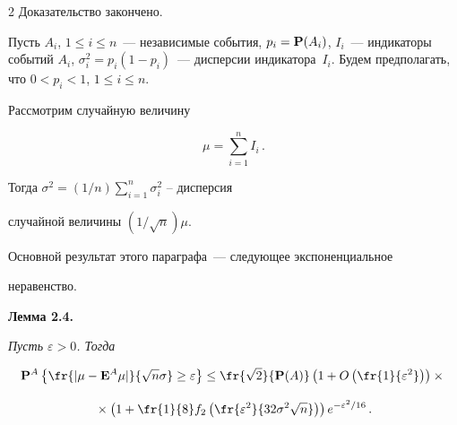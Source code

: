 \begin{multicols}{2}
Доказательство закончено.





\bigskip





Пусть $A_i$, $1\le i\le n$~--- независимые события, $p_i=\P(A_i)$, $I_i$~--- индикаторы событий $A_i$, $\sigma^2_i =


 p_i(1-p_i)$~--- дисперсии индикатора~$I_i$. Будем предполагать, что $0<p_i<1$, $1\le i\le n$. 


 Рас\-смот\-рим случайную величину


$$


\mu=\sum_{i=1}^nI_i\,.


$$


Тогда $\sigma^2=(1/n)\sum\limits_{i=1}^{n}\sigma_i^2$ -- дисперсия


случайной величины $(1/\sqrt{n})\mu$.





Основной результат этого параграфа~--- сле\-ду\-ющее экспоненциальное


неравенство.





\medskip





\noindent


\textbf{Лемма 2.4.} {\it Пусть $\varepsilon>0$. Тогда


\begin{multline}


\P^A\left\{ \fr{|\mu-{\E^A}\mu |}{\sqrt{n}\sigma} \ge


\varepsilon\right\} \le


\fr{\sqrt{2}}{\P(A)}\left(1+O\left(\fr{1}{\varepsilon^2}\right)


\right)\times{}\\[9pt]


{}\times


\left(1+\fr{1}{8}f_2\left(\fr{\varepsilon^2}{32\sigma^2\sqrt{n}}\right)\right)


e^{-{\varepsilon^2}/16 }\,. 


\label{e2.6faz}


\end{multline}


}






\end{multicols}
